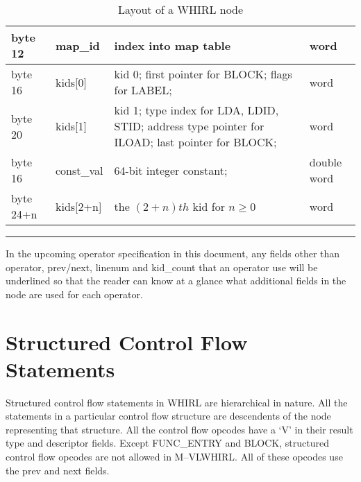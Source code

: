 \begin{table}[h]
\begin{center}
\begin{tabular}{|l|l|p{3in}|l|}
%
byte 12  & map\_id & index into map table & word \\\hline
byte 16 & kids[0] & kid 0; first pointer for
\index{BLOCK}%
BLOCK; flags for LABEL; & word \\\hline
byte 20 & kids[1] & kid 1; type index for
\index{LDA}%
LDA,
\index{LDID}%
LDID,
\index{STID}%
STID; address type pointer for
\index{ILOAD}%
ILOAD; last pointer for
\index{BLOCK}%
BLOCK; & word \\\hline
byte 16  & const\_val & 64-bit integer constant; & double word \\\hline
byte 24+n  & kids[2+n] & the $(2+n)th$ kid for $n \geq 0$ & word \\\hline
\hline
\end{tabular}
\end{center}
\vspace{2ex}
\hrule
\caption{Layout of a WHIRL node}
\label{whirl-node-layout}
\end{table}

In the upcoming operator specification in this document, any fields
other than operator, prev/next, linenum and kid\_count that an operator
use will be underlined so that the reader can know at a glance what
additional fields in the node are used for each operator.

\section{Structured Control Flow Statements}

Structured control flow statements in WHIRL are hierarchical in
nature. All the statements in a particular control flow structure
are descendents of the node representing that structure. All the
control flow opcodes have a `V' in their result type and descriptor
fields. Except 
%
FUNC\_ENTRY and
%
BLOCK, structured control flow opcodes are not
allowed in M--VLWHIRL. All of these opcodes use the prev and next
fields.


